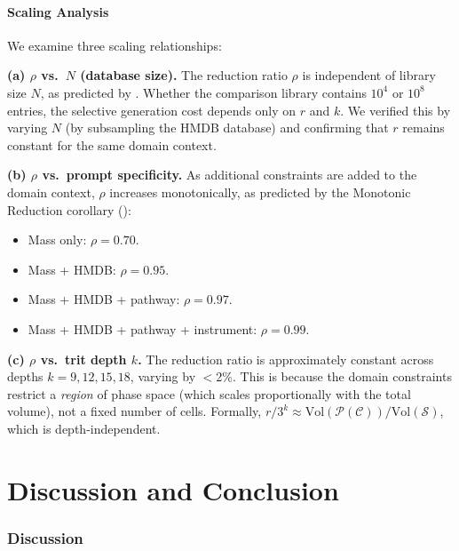\documentclass[11pt,twocolumn,a4paper]{article}
\theoremstyle{definition}
\theoremstyle{remark}
\newcommand{\Sspace}{\mathcal{S}}
\newcommand{\Purpose}{\mathcal{P}}
\newcommand{\Context}{\mathcal{C}}
\begin{document}
\subsection{Scaling Analysis}\label{sec:scaling}

We examine three scaling relationships:

\textbf{(a) $\rho$ vs.\ $N$ (database size).} The reduction ratio $\rho$ is independent of library size $N$, as predicted by . Whether the comparison library contains $10^4$ or $10^8$ entries, the selective generation cost depends only on $r$ and $k$. We verified this by varying $N$ (by subsampling the HMDB database) and confirming that $r$ remains constant for the same domain context.

\textbf{(b) $\rho$ vs.\ prompt specificity.} As additional constraints are added to the domain context, $\rho$ increases monotonically, as predicted by the Monotonic Reduction corollary ():
\begin{itemize}
  \item Mass only: $\rho = 0.70$.
  \item Mass + HMDB: $\rho = 0.95$.
  \item Mass + HMDB + pathway: $\rho = 0.97$.
  \item Mass + HMDB + pathway + instrument: $\rho = 0.99$.
\end{itemize}

\textbf{(c) $\rho$ vs.\ trit depth $k$.} The reduction ratio is approximately constant across depths $k = 9, 12, 15, 18$, varying by $<$2\%. This is because the domain constraints restrict a \emph{region} of phase space (which scales proportionally with the total volume), not a fixed number of cells. Formally, $r / 3^k \approx \mathrm{Vol}(\Purpose(\Context)) / \mathrm{Vol}(\Sspace)$, which is depth-independent.

\part{Discussion and Conclusion}\label{part:discussion}

\section{Discussion}\label{sec:discussion}
\end{document}

